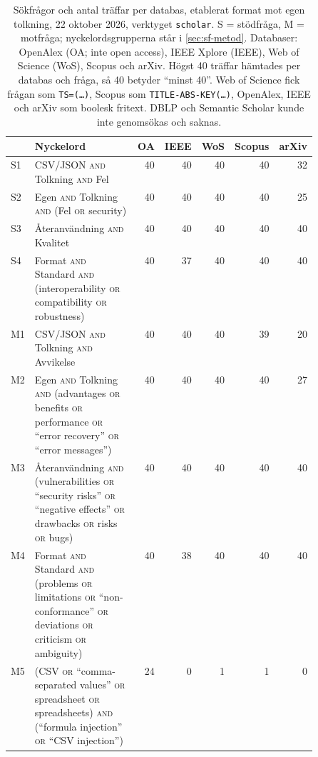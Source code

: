 \begin{table}[!b]
  \caption{Sökfrågor och antal träffar per databas, etablerat format
    mot egen tolkning, 22 oktober 2026, verktyget \texttt{scholar}.  S =
    stödfråga, M = motfråga; nyckelordsgrupperna står i
    \cref{sec:sf-metod}.  Databaser: OpenAlex (OA; inte
    \foreignlanguage{english}{open access}), IEEE Xplore (IEEE), Web of
    Science (WoS), Scopus och arXiv.  Högst 40 träffar hämtades per
    databas och fråga, så 40 betyder \enquote{minst 40}.  Web of Science
    fick frågan som \texttt{TS=(\dots)}, Scopus som
    \texttt{TITLE-ABS-KEY(\dots)}, OpenAlex, IEEE och arXiv som boolesk
    fritext.  DBLP och Semantic Scholar kunde inte genomsökas och
    saknas.}
  \label{tab:sok-queries-standardformat}
  \centering\footnotesize
  \begin{tabular}{@{}lp{0.5\linewidth}rrrrr@{}}
    \toprule
    & Nyckelord & OA & IEEE & WoS & Scopus & arXiv \\
    \midrule
    S1 & CSV/JSON \textsc{and} Tolkning \textsc{and} Fel
       & 40 & 40 & 40 & 40 & 32 \\
    S2 & Egen \textsc{and} Tolkning \textsc{and} (Fel \textsc{or}
         security) & 40 & 40 & 40 & 40 & 25 \\
    S3 & Återanvändning \textsc{and} Kvalitet & 40 & 40 & 40 & 40 & 40 \\
    S4 & Format \textsc{and} Standard \textsc{and} (interoperability
         \textsc{or} compatibility \textsc{or} robustness)
       & 40 & 37 & 40 & 40 & 40 \\
    \midrule
    M1 & CSV/JSON \textsc{and} Tolkning \textsc{and} Avvikelse
       & 40 & 40 & 40 & 39 & 20 \\
    M2 & Egen \textsc{and} Tolkning \textsc{and} (advantages \textsc{or}
         benefits \textsc{or} performance \textsc{or} \enquote{error
         recovery} \textsc{or} \enquote{error messages})
       & 40 & 40 & 40 & 40 & 27 \\
    M3 & Återanvändning \textsc{and} (vulnerabilities \textsc{or}
         \enquote{security risks} \textsc{or} \enquote{negative
         effects} \textsc{or} drawbacks \textsc{or} risks \textsc{or}
         bugs) & 40 & 40 & 40 & 40 & 40 \\
    M4 & Format \textsc{and} Standard \textsc{and} (problems \textsc{or}
         limitations \textsc{or} \enquote{non-conformance} \textsc{or}
         deviations \textsc{or} criticism \textsc{or} ambiguity)
       & 40 & 38 & 40 & 40 & 40 \\
    M5 & (CSV \textsc{or} \enquote{comma-separated values} \textsc{or}
         spreadsheet \textsc{or} spreadsheets) \textsc{and}
         (\enquote{formula injection} \textsc{or} \enquote{CSV
         injection}) & 24 & 0 & 1 & 1 & 0 \\
    \bottomrule
  \end{tabular}
\end{table}

